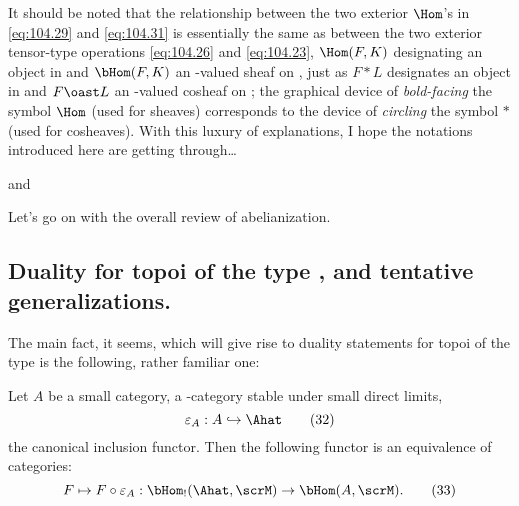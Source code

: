 \begin{comments}
  It should be noted that the relationship between the two exterior
  $\Hom$'s in \eqref{eq:104.29} and \eqref{eq:104.31} is essentially
  the same as between the two exterior tensor-type operations
  \eqref{eq:104.26} and \eqref{eq:104.23}, $\Hom(F,K)$ designating an
  object in \scrN{} and $\bHom(F,K)$ an \scrN-valued sheaf on \scrA,
  just as $F*L$ designates an object in \scrM{} and $F\oast L$ an
  \scrM-valued cosheaf on \scrA; the graphical device of
  \emph{bold-facing}
  the symbol $\Hom$ (used for sheaves) corresponds to the device of
  \emph{circling} the symbol $*$ (used for cosheaves). With this
  luxury of explanations, I hope the notations introduced here are
  getting through\ldots
\end{comments}

\bigbreak

\noindent\hfill{} and \par

\label{sec:105}%
Let's go on with the overall review of abelianization.
\addtocounter{subsection}{3}

\subsection{Duality for topoi of the type
  \texorpdfstring{\Ahat}{Ahat}, and tentative generalizations.}
\label{subsec:105.D}
The main fact, it seems, which will give rise to duality statements
for topoi of the type \Ahat{} is the following, rather familiar one:
\addtocounter{propositionnum}{2}
\begin{propositionnum}\label{prop:105.3}
  Let $A$ be a small category, \scrM{} a \scrU-category stable under
  small direct limits,
  \begin{equation}
    \label{eq:105.32}
    \varepsilon_A:A\hookrightarrow\Ahat\tag{32}
  \end{equation}
  the canonical inclusion functor. Then the following functor is an
  equivalence of categories:
  \begin{equation}
    \label{eq:105.33}
    F\mapsto F\circ\varepsilon_A: \bHom_!(\Ahat,\scrM) \to \bHom(A,\scrM).\tag{33}
  \end{equation}
\end{propositionnum}

